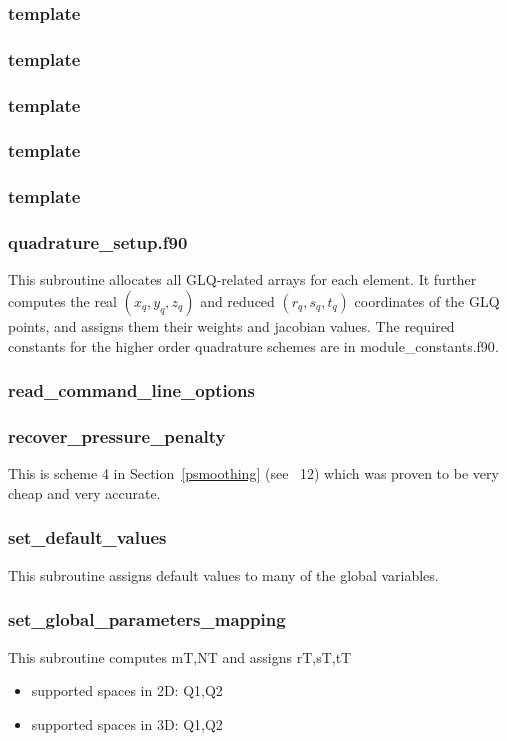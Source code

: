  \subsubsection{template}

 \subsubsection{template}

 \subsubsection{template}

 \subsubsection{template}

 \subsubsection{template}

 \subsubsection{quadrature\_setup.f90}
 This subroutine allocates all GLQ-related arrays for each element.
 It further computes the real $(x_q,y_q,z_q)$ and reduced $(r_q,s_q,t_q)$
 coordinates of the GLQ points, and assigns them their weights and
 jacobian values.
 The required constants for the higher order quadrature schemes are in 
 {\filenamefont module\_constants.f90}.
 \subsubsection{read\_command\_line\_options}

 \subsubsection{recover\_pressure\_penalty}
 This is scheme 4 in Section~\ref{psmoothing} (see \stone~12) which was proven to be 
 very cheap and very accurate. 
 \subsubsection{set\_default\_values}
 This subroutine assigns default values to many of the global variables.
 \subsubsection{set\_global\_parameters\_mapping}
 This subroutine computes mT,NT and assigns rT,sT,tT
 \begin{itemize}
 \item supported spaces in 2D: Q1,Q2
 \item supported spaces in 3D: Q1,Q2
 \end{itemize}
